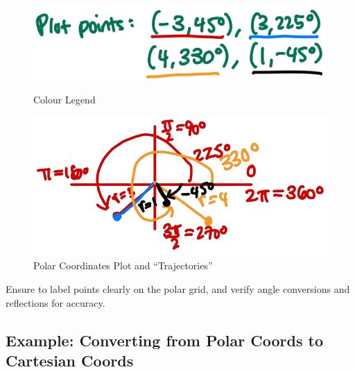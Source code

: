 \documentclass{article}
\begin{document}
\begin{examplebox}
\begin{solutionbox}
    \begin{figure}[H]
        \centering
        \begin{minipage}{0.3\textwidth}
            \centering
            \includegraphics[width=\textwidth]{plot points.png}
            \caption{Colour Legend}
            \label{fig:image1}
        \end{minipage}%
        \hspace{0.04\textwidth} %
        \begin{minipage}{0.65\textwidth}
            \centering
            \includegraphics[width=\textwidth]{plot points example.png}
            \caption{Polar Coordinates Plot and ``Trajectories''}
            \label{fig:image2}
        \end{minipage}
    \end{figure}    
\end{solutionbox}
\end{examplebox}

\begin{tipbox}
    Ensure to label points clearly on the polar grid, and verify angle conversions and reflections for accuracy.
\end{tipbox}

\subsection*{Example: Converting from Polar Coords to Cartesian Coords}
\end{document}
